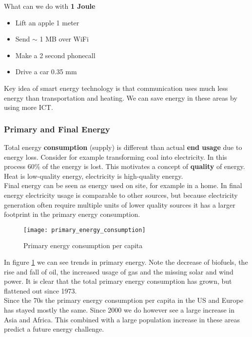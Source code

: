 What can we do with \textbf{1 Joule}
\begin{itemize}
    \item Lift an apple 1 meter
    \item Send $\sim$ 1 MB over WiFi
    \item Make a 2 second phonecall
    \item Drive a car 0.35 mm
\end{itemize}

Key idea of smart energy technology is that communication uses much less energy than transportation and heating.
We can save energy in these areas by using more ICT.

\subsubsection{Primary and Final Energy}
Total energy \textbf{consumption} (supply) is different than actual \textbf{end usage} due to energy loss.
Consider for example transforming coal into electricity.
In this process 60\% of the energy is lost.
This motivates a concept of \textbf{quality} of energy.
Heat is low-quality energy, electricity is high-quality energy.\\

Final energy can be seen as energy used on site, for example in a home.
In final energy electricity usage is comparable to other sources, but because electricity generation often require multiple units of lower quality sources it has a larger footprint in the primary energy consumption.\\

\begin{figure}
    \centering
    \texttt{[image: primary\_energy\_consumption]}
    \caption{Primary energy consumption per capita}
    \label{fig:primary_energy}
\end{figure}

In figure \ref{fig:primary_energy} we can see trends in primary energy.
Note the decrease of biofuels, the rise and fall of oil, the increased usage of gas and the missing solar and wind power. It is clear that the total primary energy consumption has grown, but flattened out since 1973.\\

Since the 70s the primary energy consumption per capita in the US and Europe has stayed mostly the same.
Since 2000 we do however see a large increase in Asia and Africa.
This combined with a large population increase in these areas predict a future energy challenge.\\

